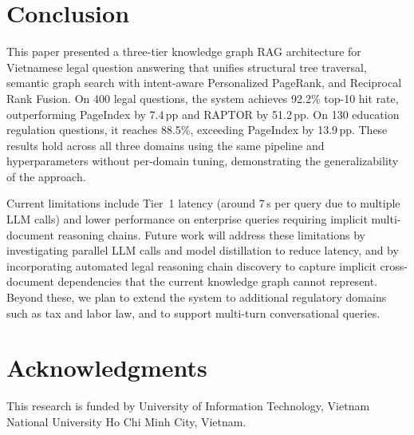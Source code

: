 \documentclass{IOS-Book-Article}
\begin{document}
\section{Conclusion}
\label{sec:conclusion}

This paper presented a three-tier knowledge graph RAG architecture for Vietnamese legal question answering that unifies structural tree traversal, semantic graph search with intent-aware Personalized PageRank, and Reciprocal Rank Fusion. On 400 legal questions, the system achieves 92.2\% top-10 hit rate, outperforming PageIndex by 7.4\,pp and RAPTOR by 51.2\,pp. On 130 education regulation questions, it reaches 88.5\%, exceeding PageIndex by 13.9\,pp. These results hold across all three domains using the same pipeline and hyperparameters without per-domain tuning, demonstrating the generalizability of the approach.

Current limitations include Tier~1 latency (around 7\,s per query due to multiple LLM calls) and lower performance on enterprise queries requiring implicit multi-document reasoning chains. Future work will address these limitations by investigating parallel LLM calls and model distillation to reduce latency, and by incorporating automated legal reasoning chain discovery to capture implicit cross-document dependencies that the current knowledge graph cannot represent. Beyond these, we plan to extend the system to additional regulatory domains such as tax and labor law, and to support multi-turn conversational queries.

\section*{Acknowledgments}
This research is funded by University of Information Technology, Vietnam National University Ho Chi Minh City, Vietnam.



\end{document}
